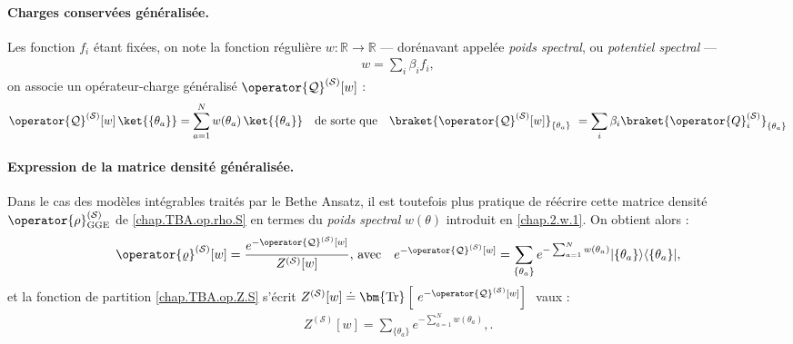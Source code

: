 \paragraph{Charges conservées généralisée.\label{sec:charges-gen}}
Les fonction $f_i$ étant fixées, on note la fonction régulière
\(
  w:\mathbb R\!\to\!\mathbb R
\)
–– dorénavant appelée \emph{poids spectral}, ou \emph{potentiel spectral} ––
\begin{eqnarray}
	w = \sum_i \beta_i f_i \label{chap.2.w.1},	
\end{eqnarray}
on associe un opérateur-charge généralisé $\operator{\mathcal{Q}}^{(\mathcal{S})}[w]$ :
\begin{eqnarray}\label{chap.2.charge.gen.1}
	\operator{\mathcal{Q}}^{(\mathcal{S})}[w]\,\ket{\{\theta_a\} } =  \sum_{a=1}^{N}w(\theta_a)\,\ket{\{\theta_a\} } \quad \mbox{de sorte que} \quad \braket{\operator{\mathcal{Q}}^{(\mathcal{S})}[w]}_{\{\theta_a\}} = \sum_{i} \beta_i  \braket{\operator{Q}^{(\mathcal{S})}_i}_{\{\theta_a\}}
\end{eqnarray}

\paragraph{Expression de la matrice densité généralisée.}
Dans le cas des modèles intégrables traités par le Bethe Ansatz, il est toutefois plus pratique de réécrire cette matrice densité  $\operator{\rho}^{(\mathcal{S})}_{\mathrm{GGE}}$ de \eqref{chap.TBA.op.rho.S} en termes du \emph{poids spectral} $w(\theta)$ introduit en \eqref{chap.2.w.1}. On obtient alors :
\begin{eqnarray}\label{chap.2.densite.1}
	\operator{\varrho}^{(\mathcal{S})}[w]  =  \frac{e^{-\operator{\mathcal{Q}}^{(\mathcal{S})}[w]}}{Z^{(\mathcal{S})}[w]}, \, \mbox{avec} \quad e^{-\operator{\mathcal{Q}}^{(\mathcal{S})}[w]}  = 	\sum_{\{\theta_a \}} e^{- \sum_{a = 1}^N w(\theta_a) } \vert \{ \theta_a\} \rangle \langle  \{ \theta_a\}  \vert, 
\end{eqnarray}	
et la fonction de partition \eqref{chap.TBA.op.Z.S} s'écrit $Z^{(\mathcal{S})}[w]\doteq \bm{\mathrm{Tr}}\left [ e^{-\operator{\mathcal{Q}}^{(\mathcal{S})}[w]}\right ] $ vaux :
\begin{eqnarray}
	Z^{(\mathcal{S})}[w]   =  \sum_{\{\theta_a \}} e^{-\sum_{a = 1}^N w(\theta_a)},\label{chap.TBA.op.Z.S.1}.	
\end{eqnarray}


